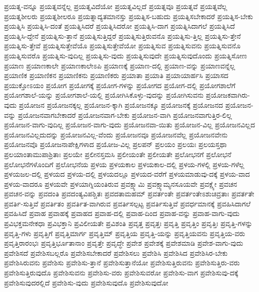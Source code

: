 {ಪ್ರಯತ್ನ-ವನ್ನೂ
ಪ್ರಯತ್ನವನ್ನೆಲ್ಲ
ಪ್ರಯತ್ನವಿದೆಯೋ
ಪ್ರಯತ್ನವಿಲ್ಲದೆ
ಪ್ರಯತ್ನವೂ
ಪ್ರಯತ್ನವೆ
ಪ್ರಯತ್ನವೆಲ್ಲ
ಪ್ರಯತ್ನಶೀಲರು
ಪ್ರಯತ್ನಶೀಲರೂ
ಪ್ರಯತ್ನಾದ್ಯತಮಾನಸ್ತು
ಪ್ರಯತ್ನಿಸ-ಬಹುದು
ಪ್ರಯತ್ನಿಸಬೇಕಾದರೆ
ಪ್ರಯತ್ನಿಸ-ಬೇಕು
ಪ್ರಯತ್ನಿಸಿ
ಪ್ರಯತ್ನಿಸಿ-ದಂತೆ
ಪ್ರಯತ್ನಿಸಿದರೆ
ಪ್ರಯತ್ನಿಸಿದರೋ
ಪ್ರಯತ್ನಿಸಿ-ದಾಗ
ಪ್ರಯತ್ನಿಸಿದಾಗಲೆ
ಪ್ರಯತ್ನಿಸಿದೆ
ಪ್ರಯತ್ನಿಸಿ-ದ್ದೇನೆ
ಪ್ರಯತ್ನಿಸು-ತ್ತಾನೆ
ಪ್ರಯತ್ನಿಸುತ್ತಿದ್ದರೆ
ಪ್ರಯತ್ನಿಸುತ್ತಿರುವನೊ
ಪ್ರಯತ್ನಿಸು-ತ್ತಿಲ್ಲ
ಪ್ರಯತ್ನಿಸು-ತ್ತೇನೆ
ಪ್ರಯತ್ನಿಸು-ತ್ತೇವೆ
ಪ್ರಯತ್ನಿಸುತ್ತೇವೆಯೊ
ಪ್ರಯತ್ನಿಸುತ್ತೇವೆಯೋ
ಪ್ರಯತ್ನಿಸುವ
ಪ್ರಯತ್ನಿಸುವನು
ಪ್ರಯತ್ನಿಸುವನೊ
ಪ್ರಯತ್ನಿಸುವರೊ
ಪ್ರಯತ್ನಿಸು-ವುದಿಲ್ಲ
ಪ್ರಯತ್ನಿಸು-ವುದು
ಪ್ರಯತ್ನಿಸುವುದೇ
ಪ್ರಯತ್ನಿಸುವುದೊಂದು
ಪ್ರಯತ್ನಿಸೋಣ
ಪ್ರಯಾಣ
ಪ್ರಯಾಣಕಾಲೇ
ಪ್ರಯಾಣಕಾಲೇಽಪಿ
ಪ್ರಯಾಣಕ್ಕೆ
ಪ್ರಯಾಣ-ದಲ್ಲಿ
ಪ್ರಯಾಣ-ವನ್ನು
ಪ್ರಯಾಣವನ್ನೆಲ್ಲ
ಪ್ರಯಾಣಿಕ
ಪ್ರಯಾಣಿಕನ
ಪ್ರಯಾಣಿಕನು
ಪ್ರಯಾಣಿಕರು
ಪ್ರಯಾತಾ
ಪ್ರಯಾತಿ
ಪ್ರಯಾಯಾರ್ಹಸಿ
ಪ್ರಯಾಸದ
ಪ್ರಯುಕ್ತೋಽಯಂ
ಪ್ರಯೋಗ
ಪ್ರಯೋಗಕ್ಕೆ
ಪ್ರಯೋಗ-ಗಳನ್ನು
ಪ್ರಯೋಗದ
ಪ್ರಯೋಗ-ದಲ್ಲಿ
ಪ್ರಯೋಗಶಾಲೆಗೆ
ಪ್ರಯೋಗಶಾಲೆ-ಯನ್ನು
ಪ್ರಯೋಗಶಾಲೆ-ಯಲ್ಲಿ
ಪ್ರಯೋಗಿಸಿಕೊಳ್ಳು-ವುದನ್ನು
ಪ್ರಯೋಗಿಸುವನು
ಪ್ರಯೋಜಕವಾಗಿರು-ವುದು
ಪ್ರಯೋಜನ
ಪ್ರಯೋಜನಕ್ಕಲ್ಲ
ಪ್ರಯೋಜನ-ಕ್ಕಾಗಿ
ಪ್ರಯೋಜನಕ್ಕೂ
ಪ್ರಯೋಜನಕ್ಕೆ
ಪ್ರಯೋಜನದ
ಪ್ರಯೋಜನ-ವನ್ನು
ಪ್ರಯೋಜನವಾಗಬೇಕಾದರೆ
ಪ್ರಯೋಜನವಾಗ-ಬೇಕು
ಪ್ರಯೋಜನ-ವಾಗಿ
ಪ್ರಯೋಜನವಾಗುತ್ತಿರ-ಲಿಲ್ಲ
ಪ್ರಯೋಜನ-ವಾಗು-ವುದಿಲ್ಲ
ಪ್ರಯೋಜನ-ವಾಗು-ವುದು
ಪ್ರಯೋಜನವಾ-ಯಿತು
ಪ್ರಯೋಜನ-ವಿಲ್ಲ
ಪ್ರಯೋಜನವಿಲ್ಲದ
ಪ್ರಯೋಜನವಿಲ್ಲದುದನ್ನು
ಪ್ರಯೋಜನವಿಲ್ಲ-ವೆಂದು
ಪ್ರಯೋಜನವೂ
ಪ್ರಯೋಜನವೆಲ್ಲ
ಪ್ರಯೋಜನವೇನು
ಪ್ರಯೋಜನವೊ
ಪ್ರಯೋಜನಾಪೇಕ್ಷಿಗಳಾದ
ಪ್ರಯೋಜ-ವಿಲ್ಲ
ಪ್ರಲಪನ್
ಪ್ರಲಯಂ
ಪ್ರಲಯಃ
ಪ್ರಲಯಸ್ತಥಾ
ಪ್ರಲಯಾಂತಾಮುಪಾಶ್ರಿತಾಃ
ಪ್ರಲಯೇ
ಪ್ರಲೀನಸ್ತಮಸಿ
ಪ್ರಲೀಯಂತೇ
ಪ್ರಲೀಯತೇ
ಪ್ರಲೋಭನಗೆ
ಪ್ರಲೋಭನೆ
ಪ್ರಲೋಭನೆಗಳೊಂದಿಗೆ
ಪ್ರಲೋಭನೆಯ
ಪ್ರಳಯ
ಪ್ರಳಯಕಾಲ
ಪ್ರಳಯಕಾಲ-ದಲ್ಲಿ
ಪ್ರಳಯ-ಗಳಲ್ಲಿ
ಪ್ರಳಯ-ಗಳೆಲ್ಲ
ಪ್ರಳಯಜಲ-ದಲ್ಲಿ
ಪ್ರಳಯದ
ಪ್ರಳಯ-ದಲ್ಲಿ
ಪ್ರಳಯದಲ್ಲೂ
ಪ್ರಳಯದ-ವರೆಗೆ
ಪ್ರಳಯಮಾಡುವು-ದಕ್ಕೆ
ಪ್ರಳಯ-ವಾದ
ಪ್ರಳಯ-ವಾದರೂ
ಪ್ರಳಯವೇ
ಪ್ರಳಯಾಗ್ನಿಯಂತಿರುವ
ಪ್ರವಕ್ಷ್ಯಾಮಿ
ಪ್ರವಕ್ಷ್ಯಾಮ್ಯನಸೂಯವೇ
ಪ್ರವಕ್ಷ್ಯೇ
ಪ್ರವಚನ
ಪ್ರವಚನ-ವನ್ನು
ಪ್ರವದಂತಿ
ಪ್ರವದಂತ್ಯವಿಪಶ್ಚಿತಃ
ಪ್ರವದತಾಮಹಮ್
ಪ್ರವರ್ತಂತೇ
ಪ್ರವರ್ತಂತೇಽಶುಚಿವ್ರತಾಃ
ಪ್ರವರ್ತತೇ
ಪ್ರವರ್ತಿ-ಸುತ್ತಿವೆ
ಪ್ರವರ್ತಿತಂ
ಪ್ರವರ್ತಿತ-ವಾಗಿರುವ
ಪ್ರವರ್ತಿಸಲ್ಪಟ್ಟ
ಪ್ರವರ್ತಿಸುತ್ತಿವೆ
ಪ್ರವರ್ಧಮಾನಕ್ಕೆ
ಪ್ರವಹಿಸಿದಾಗಲೆ
ಪ್ರವಹಿಸಿದೆ
ಪ್ರವಾಹ
ಪ್ರವಾಹಕ್ಕೆ
ಪ್ರವಾಹದ
ಪ್ರವಾಹ-ದಲ್ಲಿ
ಪ್ರವಾಹ-ದಿಂದ
ಪ್ರವಾಹ-ವನ್ನು
ಪ್ರವಾಹ-ವಾಗು-ವುದು
ಪ್ರವಿಭಕ್ತಮನೇಕಧಾ
ಪ್ರವಿಭಕ್ತಾನಿ
ಪ್ರವಿಲೀಯತೇ
ಪ್ರವಿಶಂತಿ
ಪ್ರವೃತ್ತ
ಪ್ರವೃತ್ತಃ
ಪ್ರವೃತ್ತಿ
ಪ್ರವೃತ್ತಿಂ
ಪ್ರವೃತ್ತಿಃ
ಪ್ರವೃತ್ತಿ-ಗಳನ್ನು
ಪ್ರವೃತ್ತಿ-ಗಳು
ಪ್ರವೃತ್ತಿಗೆ
ಪ್ರವೃತ್ತಿಮಾರ್ಗ
ಪ್ರವೃತ್ತಿಮ್
ಪ್ರವೃತ್ತಿಯ
ಪ್ರವೃತ್ತಿ-ಯನ್ನು
ಪ್ರವೃತ್ತಿಯವನು
ಪ್ರವೃತ್ತಿಯ-ವರು
ಪ್ರವೃತ್ತಿರಾರಂಭಃ
ಪ್ರವೃತ್ತಿರ್ಭೂತಾನಾಂ
ಪ್ರವೃತ್ತೇ
ಪ್ರವೃದ್ಧೇ
ಪ್ರವೇಶ
ಪ್ರವೇಶಕ್ಕೆ
ಪ್ರವೇಶಮಾಡಿ
ಪ್ರವೇಶ-ವಾಗು-ವುದು
ಪ್ರವೇಶಿಸದೆ
ಪ್ರವೇಶಿಸಬಲ್ಲರೊ
ಪ್ರವೇಶಿಸಬೇಕಾದರೆ
ಪ್ರವೇಶಿಸಲು
ಪ್ರವೇಶಿಸಿ
ಪ್ರವೇಶಿಸಿದ
ಪ್ರವೇಶಿಸಿರ-ಬೇಕು
ಪ್ರವೇಶಿಸಿರುವನು
ಪ್ರವೇಶಿಸು
ಪ್ರವೇಶಿಸು-ತ್ತಾನೆ
ಪ್ರವೇಶಿಸುತ್ತಾನೆಯೋ
ಪ್ರವೇಶಿಸುತ್ತಿರುವನು
ಪ್ರವೇಶಿಸುತ್ತಿರು-ವರು
ಪ್ರವೇಶಿಸುತ್ತಿರುವುದೊ
ಪ್ರವೇಶಿಸುವನು
ಪ್ರವೇಶಿಸು-ವರು
ಪ್ರವೇಶಿಸುವರೋ
ಪ್ರವೇಶಿಸು-ವಾಗ
ಪ್ರವೇಶಿಸುವು-ದಕ್ಕೆ
ಪ್ರವೇಶಿಸುವುದರಲ್ಲಿದೆ
ಪ್ರವೇಶಿಸು-ವುದು
ಪ್ರವೇಶಿಸುವುದೊ
ಪ್ರವೇಶಿಸುವುದೋ
}
